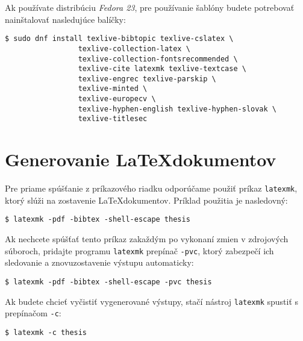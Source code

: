 Ak používate distribúciu \emph{Fedora 23}, pre používanie šablóny budete potrebovať nainštalovať nasledujúce balíčky:

\begin{verbatim}
$ sudo dnf install texlive-bibtopic texlive-cslatex \
                 texlive-collection-latex \
                 texlive-collection-fontsrecommended \
                 texlive-cite latexmk texlive-textcase \
                 texlive-engrec texlive-parskip \
                 texlive-minted \
                 texlive-europecv \
                 texlive-hyphen-english texlive-hyphen-slovak \
                 texlive-titlesec
\end{verbatim}


\section{Generovanie \LaTeX dokumentov}

Pre priame spúšťanie z príkazového riadku odporúčame použiť príkaz {\tt latexmk}, ktorý slúži na zostavenie  \LaTeX dokumentov. Príklad použitia je nasledovný:

\begin{verbatim}
$ latexmk -pdf -bibtex -shell-escape thesis
\end{verbatim}

Ak nechcete spúšťať tento príkaz zakaždým po vykonaní zmien v zdrojových súboroch, pridajte programu {\tt latexmk} prepínač {\tt -pvc}, ktorý zabezpečí ich sledovanie a znovuzostavenie výstupu automaticky:

\begin{verbatim}
$ latexmk -pdf -bibtex -shell-escape -pvc thesis
\end{verbatim}

Ak budete chcieť vyčistiť vygenerované výstupy, stačí nástroj {\tt latexmk} spustiť s prepínačom {\tt -c}:

\begin{verbatim}
$ latexmk -c thesis
\end{verbatim}
